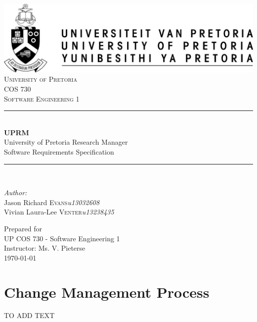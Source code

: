 \documentclass[12pt, a4paper]{article}
\begin{document}
	\begin{titlepage}
		\newcommand{\HRule}{\rule{\linewidth}{0.5mm}}
		\center
		
		\includegraphics{up-logo.jpg} \\[1cm]
		
		\textsc{\LARGE University of Pretoria}\\[1.5cm]
		\textsc{\Large COS 730}\\[0.5cm]
		\textsc{\large Software Engineering 1}\\[0.5cm]

		\HRule \\[0.4cm]
		{ \huge \bfseries UPRM}\\[0.4cm]
		{\large University of Pretoria Research Manager}\\
		{Software Requirements Specification}\\

		\HRule \\[1.5cm]
		
		\begin{minipage}{1\textwidth}
			\begin{flushleft} \large
				\emph{Author:}\\
				Jason Richard \textsc{Evans}\hfill \emph{u13032608}\\
				Vivian Laura-Lee \textsc{Venter}\hfill \emph{u13238435} \\[1cm]
			\end{flushleft}
		\end{minipage}
		
		\vfill
		Prepared for \\
		UP COS 730 - Software Engineering 1 \\
		Instructor: Ms. V. Pieterse \\
		{\large \today}\\[6cm]
		\vfill	
	\end{titlepage}

	\tableofcontents
	\pagebreak

	
	\pagebreak

	
	\pagebreak

	
	\pagebreak

	

	\section{Change Management Process}
	TO ADD TEXT

	\pagebreak

	

	
\end{document}

